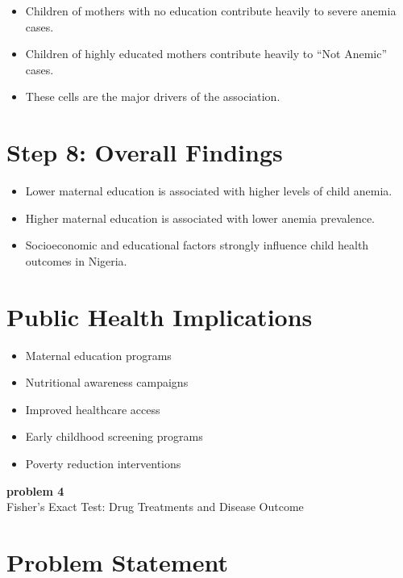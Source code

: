 \documentclass[12pt]{article}
\begin{document}
\begin{itemize}
    \item Children of mothers with no education contribute heavily to severe anemia cases.
    \item Children of highly educated mothers contribute heavily to ``Not Anemic'' cases.
    \item These cells are the major drivers of the association.
\end{itemize}

\section*{Step 8: Overall Findings}

\begin{itemize}
    \item Lower maternal education is associated with higher levels of child anemia.
    \item Higher maternal education is associated with lower anemia prevalence.
    \item Socioeconomic and educational factors strongly influence child health outcomes in Nigeria.
\end{itemize}

\section*{Public Health Implications}

\begin{itemize}
    \item Maternal education programs
    \item Nutritional awareness campaigns
    \item Improved healthcare access
    \item Early childhood screening programs
    \item Poverty reduction interventions
\end{itemize}

\newpage

\begin{center}
    {\LARGE \textbf{ problem 4}}\\[0.3cm]
    {\large Fisher's Exact Test: Drug Treatments and Disease Outcome}
\end{center}




\section*{Problem Statement}
\end{document}
